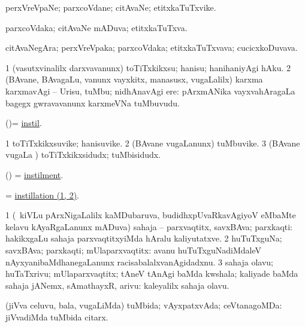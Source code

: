 \bentry
{}
\gl{\nA}
\bmng
perxVreVpaNe; parxcoVdane; citAvaNe; etitxkaTuTxvike. 
\emng
\eentry

\bentry
{}
\gl{\gu}
\bmng
parxcoVdaka; citAvaNe mADuva; etitxkaTuTxva. 
\emng
\eentry

\bentry
{}
\gl{\nA}
\bmng
citAvaNegAra; perxVreVpaka; parxcoVdaka; etitxkaTuTxvava; cucicxkoDuvava. 
\emng
\eentry

\bentry
{}
\gl{\sakirx}
\bmng
\bnum
\num{1} (vasutxvinalilx darxvavanunx) toTiTxkikxsu; hanisu; hanihaniyAgi hAku. 
\num{2} (BAvane, BAvagaLu, \mo vanunx vayxkitx, manasusx, \mo vugaLalilx) karxma karxmavAgi -- Urisu, tuMbu; nidhAnavAgi ere:  pArxmANika vayxvahAragaLa bagegx gwravavanunx karxmeVNa tuMbuvudu. 
\enum
\emng
\eentry

\bentry
{}
\gl{\sakirx}
\bmng
(\ame)= \hyperlink{instil}{instil}. 
\emng
\eentry

\bentry
{}
\gl{\nA}
\bmng
\bnum
\num{1} toTiTxkikxsuvike; hanisuvike. 
\num{2} (BAvane \mo vugaLanunx) tuMbuvike. 
\num{3} (BAvane \mo vugaLa \vi) toTiTxkikxsidudx; tuMbisidudx. 
\enum
\emng
\eentry

\bentry
{}
\gl{\nA}
\bmng
(\ame) = \hyperlink{instilment}{instilment}. 
\emng
\eentry

\bentry
{}
\gl{\nA}
\bmng
= \hyperlink{instillation}{instillation (1, 2)}. 
\emng
\eentry

\bentry
{}
\gl{\nA}
\bmng
\bnum
\num{1} (\kanmu\ kiVLu pArxNigaLalilx kaMDubaruva, budidhxpUvaRkavAgiyoV eMbaMte kelavu kAyaRgaLanunx mADuva) sahaja -- parxvaqtitx, savxBAva; parxkaqti:  hakikxgaLu sahaja parxvaqtitxyiMda hAralu kaliyutatxve. 
\num{2} huTuTxguNa; savxBAva; parxkaqti; mUlaparxvaqtitx:  avanu huTuTxguNadiMdaleV nAyxyanibaMdhanegaLanunx racisabalalxvanAgidadxnu. 
\num{3} sahaja olavu; huTaTxrivu; mUlaparxvaqtitx; tAneV tAnAgi baMda kwshala; kaliyade baMda sahaja jANemx, sAmathayxR, arivu:  kaleyalilx sahaja olavu. 
\enum
\emng
\eentry

\bentry
{}
\gl{\Agu}
\bmng
(jiVva celuvu, bala, \mo vugaLiMda) tuMbida; vAyxpatxvAda; ceVtanagoMDa:  jiVvadiMda tuMbida citarx. 
\emng
\eentry

